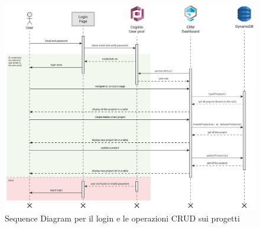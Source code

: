 \documentclass[target=bach,aauheader=,style=]{thud}
\begin{document}
\begin{figure}[h!]
    \centering
    \includegraphics[width=1\textwidth]{img/diagrammi/sequence.pdf} 
    \caption{Sequence Diagram per il login e le operazioni CRUD sui progetti}
\end{figure}





\end{document}
